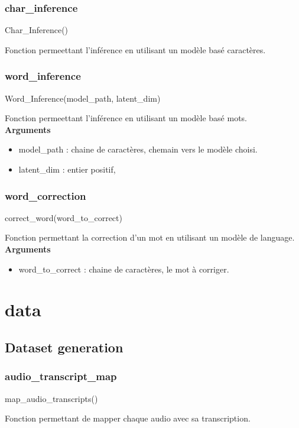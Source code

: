     
    \subsubsection{char\_inference}
    \begin{tcolorbox}
    Char\_Inference()
    \end{tcolorbox}
    Fonction permeettant l'inférence en utilisant un modèle basé caractères. \\
    \subsubsection{word\_inference}
    \begin{tcolorbox}
    Word\_Inference(model\_path, latent\_dim)
    \end{tcolorbox}
    Fonction permeettant l'inférence en utilisant un modèle basé mots. \\
    \textbf{Arguments} 
    \begin{itemize}
        \item model\_path : chaine de caractères, chemain vers le modèle choisi.
        \item latent\_dim : entier positif, 
    \end{itemize}
    
    \subsubsection{word\_correction}
    \begin{tcolorbox}
    correct\_word(word\_to\_correct)
    \end{tcolorbox}
    Fonction permettant la correction d'un mot en utilisant un modèle de language. \\
    \textbf{Arguments}
    \begin{itemize}
        \item word\_to\_correct : chaine de caractères, le mot à corriger.
    \end{itemize}
    

\section{data}
    \subsection{Dataset generation}
    \subsubsection{audio\_transcript\_map}
    \begin{tcolorbox}
    map\_audio\_transcripts()
    \end{tcolorbox}
    Fonction permettant de mapper chaque audio avec sa transcription.
